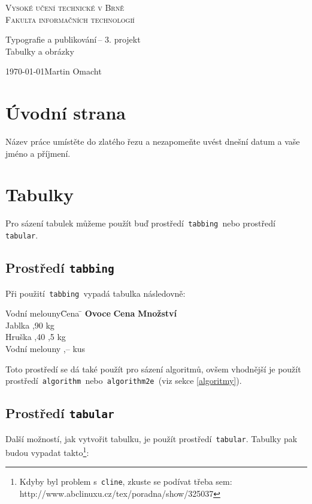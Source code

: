 \documentclass[11pt,a4paper]{article}
\begin{document}
	\begin{titlepage}
		\begin{center}
			\Huge
			\textsc{Vysoké učení technické v Brně\\[-2mm]
			\huge Fakulta informačních technologií}
		
			
			\LARGE
			Typografie a publikování\,-- 3. projekt\\[-0.5mm]
			\Huge Tabulky a obrázky
		\end{center}
		{\Large \today \hfill Martin Omacht}
	\end{titlepage}
	
	\section{Úvodní strana}
	Název práce umístěte do zlatého řezu a nezapomeňte uvést dnešní datum a vaše jméno a příjmení.
	
	\section{Tabulky}
	Pro sázení tabulek můžeme použít buď prostředí\texttt{ tabbing }nebo prostředí\texttt{ tabular}.

	\subsection{Prostředí \texttt{tabbing}}
	Při použití\texttt{ tabbing }vypadá tabulka následovně:
	
		\begin{tabbing}
			Vodní melouny\qquad \= Cena \qquad \= \kill
			\textbf{Ovoce} 	\> \textbf{Cena} 	\> \textbf{Množství} \\
			Jablka 			,90			 kg \\
			Hruška			,40			,5 kg \\
			Vodní melouny	,--				 kus \\
		\end{tabbing}
	
	\noindent Toto prostředí se dá také použít pro sázení algoritmů, ovšem vhodnější je použít prostředí\texttt{ algorithm }nebo\texttt{ algorithm2e }(viz sekce \ref{algoritmy}).

	\subsection{Prostředí \texttt{tabular}}
	Další možností, jak vytvořit tabulku, je použít prostředí\texttt{ tabular}. Tabulky pak 
	budou vypadat takto\footnote{Kdyby byl problem s\texttt{ cline}, zkuste se podívat třeba sem: http://www.abclinuxu.cz/tex/poradna/show/325037}:
	
\end{document}
